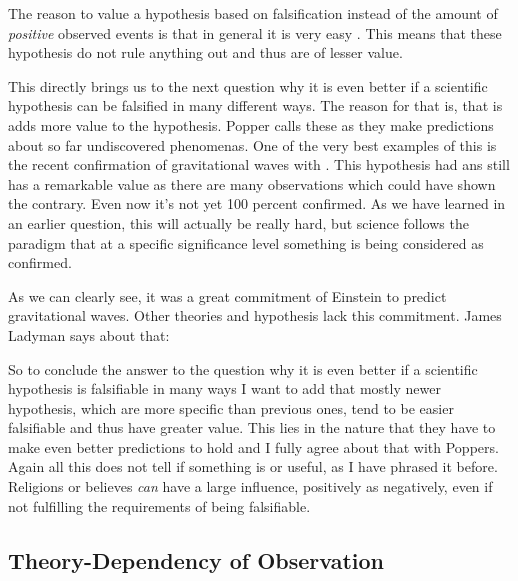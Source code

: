 \documentclass[11pt]{scrartcl}
\begin{document}
The reason to value a hypothesis based on falsification instead of the amount of \textit{positive} observed events is that in general it is very easy  \cite[p. 66]{ladyman}. This means that these hypothesis do not rule anything out and thus are of lesser value.

This directly brings us to the next question why it is even better if a scientific hypothesis can be falsified in many different ways. The reason for that is, that is adds more value to the hypothesis. Popper calls these  \cite[p. 68]{ladyman} as they make predictions about so far undiscovered phenomenas. One of the very best examples of this is the recent confirmation of gravitational waves with  \cite{ligo}. This hypothesis had ans still has a remarkable value as there are many observations which could have shown the contrary. Even now it's not yet 100 percent confirmed. As we have learned in an earlier question, this will actually be really hard, but science follows the paradigm that at a specific significance level something is being considered as confirmed.

As we can clearly see, it was a great commitment of Einstein to predict gravitational waves. Other theories and hypothesis lack this commitment. James Ladyman says about that: 

So to conclude the answer to the question why it is even better if a scientific hypothesis is falsifiable in many ways I want to add that mostly newer hypothesis, which are more specific than previous ones, tend to be easier falsifiable and thus have greater value. This lies in the nature that they have to make even better predictions to hold \cite[p. 73]{ladyman} and I fully agree about that with Poppers. Again all this does not tell if something is  \cite[p. 72]{ladyman} or useful, as I have phrased it before. Religions or believes \textit{can} have a large influence, positively as negatively, even if not fulfilling the requirements of being falsifiable.

\subsection{Theory-Dependency of Observation}
\end{document}
